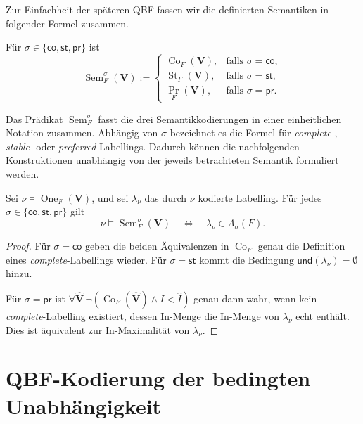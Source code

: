 Zur Einfachheit der späteren QBF fassen wir die definierten Semantiken in 
folgender Formel zusammen.
\begin{Definition}
    \label{def:uniform-semantics-predicate}
    Für
    \(\sigma\in\{\mathsf{co},\mathsf{st},\mathsf{pr}\}\) ist
    \[
        \operatorname{Sem}^{\sigma}_F(\mathbf V)
        :=
        \begin{cases}
            \operatorname{Co}_F(\mathbf V),
                &\text{falls }\sigma=\mathsf{co},\\
            \operatorname{St}_F(\mathbf V),
                &\text{falls }\sigma=\mathsf{st},\\
            \operatorname{Pr}_F(\mathbf V),
                &\text{falls }\sigma=\mathsf{pr}.
        \end{cases}
    \]
\end{Definition}
Das Prädikat \(\operatorname{Sem}^{\sigma}_F\) fasst die drei Semantikkodierungen in einer einheitlichen Notation zusammen. 
Abhängig von \(\sigma\) bezeichnet es die Formel für \emph{complete}-, \emph{stable}- oder \emph{preferred}-Labellings. 
Dadurch können die nachfolgenden Konstruktionen unabhängig von der jeweils betrachteten Semantik formuliert werden.
\begin{Lemma}
    \label{lem:semantics-encoding-correct}
    Sei \(\nu\models\operatorname{One}_F(\mathbf V)\), und sei
    \(\lambda_\nu\) das durch \(\nu\) kodierte Labelling. Für jedes
    \(\sigma\in\{\mathsf{co},\mathsf{st},\mathsf{pr}\}\) gilt
    \[
        \nu\models\operatorname{Sem}^{\sigma}_F(\mathbf V)
        \quad\Longleftrightarrow\quad
        \lambda_\nu\in\Lambda_\sigma(F).
    \]
\end{Lemma}
\begin{proof}
    Für \(\sigma=\mathsf{co}\) geben die beiden Äquivalenzen in
    \(\operatorname{Co}_F\) genau die Definition eines \emph{complete}-Labellings wieder. 
    Für \(\sigma=\mathsf{st}\) kommt die Bedingung
    \(\mathsf{und}(\lambda_\nu)=\emptyset\) hinzu.

    Für \(\sigma=\mathsf{pr}\) ist
    \(\forall\widehat{\mathbf V}\,
        \neg (\operatorname{Co}_F(\widehat{\mathbf V})
        \land I < \widehat{I})\) genau dann wahr, wenn kein \emph{complete}-Labelling existiert,
    dessen In-Menge die In-Menge von \(\lambda_\nu\) echt enthält.
    Dies ist äquivalent zur In-Maximalität von \(\lambda_\nu\).
\end{proof}

\section{QBF-Kodierung der bedingten Unabhängigkeit}
\label{sec:uniform-independence-qbf}


